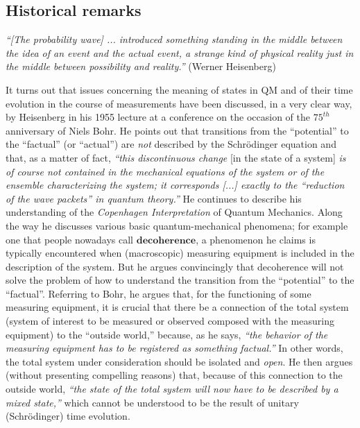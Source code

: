 \documentclass[12pt]{article}
\begin{document}
\subsection{Historical remarks}

\hspace{0.5cm}\textit{``[The probability wave] ... introduced something standing in the middle between the idea of an event and the actual event, a strange kind of physical reality just in the middle between possibility and reality.''} (Werner Heisenberg)

It turns out that issues concerning the meaning of states in QM and of their time evolution in the course of
measurements have been discussed, in a very clear way, by {Heisenberg} in his 1955 lecture
\cite{Heisenberg} at a conference on the occasion of the $75^{th}$ anniversary of {Niels Bohr}. He points out
that transitions from the ``potential'' to the ``factual'' (or ``actual'') are \textit{not} described by the Schr\"odinger equation
and that, as a matter of fact, \textit{``this discontinuous change} [in the state of a system] \textit{is of course not
contained in the mechanical equations of the system or of the ensemble characterizing the system; it corresponds [...]
exactly to the ``reduction of the wave packets'' in quantum theory.''} He continues to describe his
understanding of the \textit{Copenhagen Interpretation} of Quantum Mechanics. Along the way he discusses various
basic quantum-mechanical phenomena; for example one that people nowadays call $\mathbf{decoherence}$, a phenomenon
he claims is typically encountered when (macroscopic) measuring equipment is included in the description of the system.
But he argues convincingly that decoherence will not solve the problem of how to
understand the transition from the ``potential'' to the ``factual''.
Referring to {Bohr}, he argues that, for the functioning
of some measuring equipment, it is crucial that there be a connection of the total system (system of interest to be
measured or observed composed with the measuring equipment) to the ``outside world,'' because, as he says,
\textit{``the behavior of the measuring equipment has to be registered as something factual.''} In other words, the total
system under consideration should be isolated and \textit{open}.
He then argues (without presenting compelling reasons) that, because of this connection to the outside
world, \textit{``the state of the total system will now have to be  described by a mixed state,''} which
cannot be understood to be the result of unitary (Schr\"odinger) time evolution.
\end{document}
